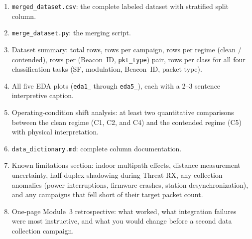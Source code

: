 \documentclass[11pt,letterpaper]{article}
\begin{document}
\begin{tcolorbox}[deliverable={Lab Handout 3-H Deliverable --- and Module 3 Final Deliverable}]
	\begin{enumerate}[leftmargin=1.2em]
		\item \texttt{merged\_dataset.csv}: the complete labeled dataset with stratified split column.
		\item \texttt{merge\_dataset.py}: the merging script.
		\item Dataset summary: total rows, rows per campaign, rows per regime (clean / contended), rows per (Beacon~\mbox{ID}, \texttt{pkt\_type}) pair, rows per class for all four classification tasks (SF, modulation, Beacon~ID, packet type).
		\item All five \mbox{EDA} plots (\texttt{eda1\_} through \texttt{eda5\_}), each with a 2--3 sentence interpretive caption.
		\item Operating-condition shift analysis: at least two quantitative comparisons between the clean regime (C1, C2, and C4) and the contended regime (C5) with physical interpretation.
		\item \texttt{data\_dictionary.md}: complete column documentation.
		\item Known limitations section: indoor multipath effects, distance measurement uncertainty, half-duplex shadowing during Threat RX, any collection anomalies (power interruptions, firmware crashes, station desynchronization), and any campaigns that fell short of their target packet count.
		\item One-page Module~3 retrospective: what worked, what integration failures were most instructive, and what you would change before a second data collection campaign.
	\end{enumerate}
\end{tcolorbox}

\printhandoutglossary
\end{document}
